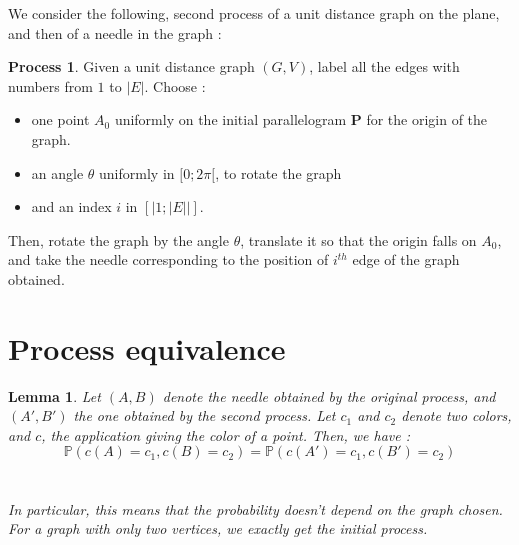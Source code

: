 \documentclass[a4paper,11pt]{article}
\newtheorem{lemma}{Lemma}
\theoremstyle{definition}
\newtheorem{process}{Process}
\theoremstyle{remark}
\begin{document}
We consider the following, second process of a unit distance graph on the plane, and then of a needle in the graph : \\
\begin{process}
Given a unit distance graph $(G,V)$, label all the edges with numbers from $1$ to $|E|$. Choose : 
\begin{itemize}
\item one point $A_0$ uniformly on the initial parallelogram $\mathbf{P}$ for the origin of the graph.
\item an angle $\theta$ uniformly in $[0;2\pi[$, to rotate the graph
\item and an index $i$ in $[|1;|E||]$.
\end{itemize}
Then, rotate the graph by the angle $\theta$, translate it so that the origin falls on  $A_0$, and take the needle corresponding to the position of $i^{th}$ edge of the graph obtained. 
\end{process}
\vspace{1 cm} 

\section{Process equivalence}
\label{equiv}
\begin{lemma}\label{huitre}
Let $(A,B)$ denote the needle obtained by the original process, and
$(A',B')$ the one obtained by the second process. Let $c_1$ and $c_2$ denote two colors, and $c$, the application giving the color of a point. Then, we have :\\
 $$\mathbb{P}(c(A) = c_1 , c(B) = c_2) = \mathbb{P}(c(A') = c_1, c(B') = c_2) $$ \\
 \\
 In particular, this means that the probability doesn't depend on the graph chosen. For a graph with only two vertices, we exactly get the initial process.
\end{lemma}
\end{document}
